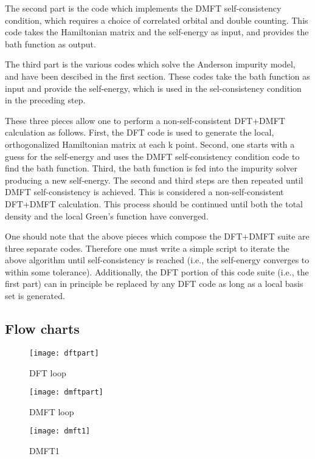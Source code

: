 \documentclass[12 pt]{article}
\begin{document}
{  The second part is the code which implements the DMFT self-consistency condition, which requires a choice of 
correlated orbital and double counting. This code takes the Hamiltonian matrix and the self-energy as input, and 
provides the bath function as output.

  The third part is the various codes which solve the Anderson impurity model, and have been descibed in the 
first section. These codes take the bath function as input and provide the self-energy, which is used in the 
sel-consistency condition in the preceding step.

  These three pieces allow one to perform a non-self-consistent DFT+DMFT calculation as follows. First, the DFT 
code is used to generate the local, orthogonalized Hamiltonian matrix at each k point. Second, one starts with 
a guess for the self-energy and uses the DMFT self-consistency condition code to find the bath function. Third, 
the bath function is fed into the impurity solver producing a new self-energy. The second and third steps are 
then repeated until DMFT self-consistency is achieved. This is considered a non-self-consistent DFT+DMFT calculation. 
This process should be continued until both the total density and the local Green's function have converged. 

  One should note that the above pieces which compose the DFT+DMFT suite are three separate codes. Therefore one 
must write a simple script to iterate the above algorithm until self-consistency is reached (i.e., the self-energy 
converges to within some tolerance). Additionally, the DFT portion of this code suite (i.e., the first part) can 
in principle be replaced by any DFT code as long as a local basis set is generated. 

      \newpage
      \subsection{Flow charts}\label{subsec:Flow charts}

\smallskip
\begin{figure}
 \centering
 \texttt{[image: dftpart]}
 \caption{DFT loop}
 \label{DFT loop figure}
\end{figure}

\begin{figure}
 \centering
 \texttt{[image: dmftpart]}
 \caption{DMFT loop}
 \label{DMFT loop figure}
\end{figure}

\begin{figure}
 \centering
 \texttt{[image: dmft1]}
 \caption{DMFT1}
 \label{DMFT1 figure}
\end{figure}

}
\end{document}
